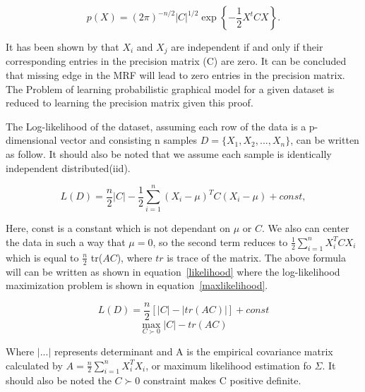 \documentclass{article} %
\begin{document}
\begin{equation}\label{gaussian2}
p(X) = (2\pi)^{-n/2} |C|^{1/2} \exp\left\{ -\frac{1}{2}X^t C X \right\}.
\end{equation}

It has been shown by \cite{lauritzen1996graphical} that $X_i$ and $X_j$ are 
independent if and only if their corresponding entries in the precision 
matrix (C) are zero. It can be concluded that missing edge in the MRF will 
lead to zero entries in the precision matrix\cite{Rish2014Book}. The Problem 
of learning probabilistic graphical model for a given dataset is reduced to 
learning the precision matrix given this proof.

The Log-likelihood of the dataset, assuming each row of the data is a
p-dimensional vector and consisting n samples $D = \{X_1, X_2, ... , X_n\}$, 
can be written as follow. It should also be noted that we assume each sample 
is identically independent distributed(iid).

\begin{equation}
L(D) = \frac{n}{2} |C| - \frac{1}{2} \sum_{i=1}^{n} (X_i - \mu )^T C (X_i - \mu ) + const,
\end{equation}  

Here, const is a constant which is not dependant on $\mu$ or $C$. We also can 
center the data in such a way that $\mu = 0$, so the second term reduces to 
$\frac{1}{2} \sum_{i=1}^{n} X_i ^T C X_i$ which is equal to 
$\frac{n}{2}$ tr($AC$), where $tr$ is trace of the matrix. The above 
formula will can be written as shown in equation~\eqref{likelihood} where the
log-likelihood maximization problem is shown in 
equation~\eqref{maxlikelihood}. 

\begin{multicols}{2}
\begin{equation}\label{likelihood}
L(D) = \frac{n}{2} [|C| -  |tr(AC)|] + const
\end{equation}\break
\begin{equation}\label{maxlikelihood}
\max_{C\succ0} |C| - tr(AC)
\end{equation}
\end{multicols}

Where $|...|$ represents determinant and A is the empirical covariance 
matrix calculated by $A = \frac{n}{2} \sum_{i=1}^{n} X_i^T X_i$, or 
maximum likelihood estimation fo $\Sigma$. It should also be noted 
the $C\succ0$ constraint makes C positive definite.\\
\end{document}
